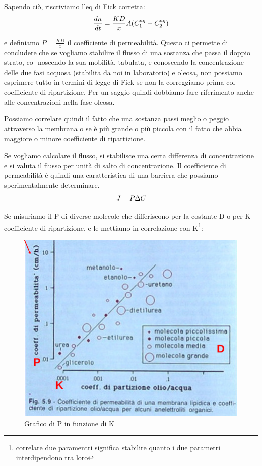\documentclass[a4paper,12pt]{article}
\begin{document}
Sapendo ciò, riscriviamo l'eq di Fick corretta:
\begin{equation}
\centering
\frac{dn}{dt} = \frac{KD}{x} A(C^{aq}_{1} - C^{aq}_{2})
\end{equation}

e definiamo $P = \frac{KD}{x}$ il coefficiente di permeabilità.
Questo ci permette di concludere che se vogliamo stabilire il flusso di una sostanza che passa il doppio strato, co-
noscendo la sua mobilità, tabulata, e conoscendo la concentrazione delle due fasi acquosa (stabilita da noi in laboratorio) e oleosa, non possiamo esprimere tutto in termini di legge di Fick se non la correggiamo prima
col coefficiente di ripartizione. Per un saggio quindi dobbiamo fare riferimento anche alle concentrazioni nella
fase oleosa.

Possiamo correlare quindi il fatto che una sostanza passi meglio o peggio attraverso la membrana o se è più grande o più piccola con il fatto che abbia maggiore o minore coefficiente di ripartizione.

Se vogliamo calcolare il flusso, si stabilisce una certa differenza di concentrazione e si valuta il flusso per unità di salto di concentrazione. Il coefficiente di permeabilità è quindi una caratteristica di una barriera che possiamo sperimentalmente determinare.
\begin{equation}
\centering
J = P \Delta C
\end{equation}

Se misuriamo il P di diverse molecole che differiscono per la costante D o per K coefficiente di ripartizione, e le mettiamo in correlazione con K\footnote{correlare due paramentri significa stabilire quanto i due parametri interdipendono tra loro}: 
\begin{figure}[H]
\centering
\includegraphics[scale=0.5]{immagine/ripartizione.jpg}
\caption{Grafico di P in funzione di K}
\end{figure}
\end{document}
